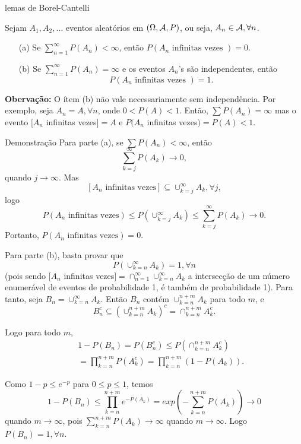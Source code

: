 \begin{frame}{lemas de Borel-Cantelli}

\begin{lema}
	Sejam $A_1,A_2,\ldots$ eventos aleatórios em $(\Omega,{\cal A},P)$, ou
	seja, $A_n\in {\cal A}, \forall n$.
	\begin{itemize}
		\item[(a)] Se $\sum_{n=1}^{\infty}P(A_n)<\infty$, então $P(A_n\mbox{ infinitas vezes
		})=0$.
		
		\item[(b)] Se $\sum_{n=1}^{\infty}P(A_n)=\infty$ e os eventos $A_n$'s são independentes, então
		$$P(A_n\mbox{ infinitas vezes
		})=1.$$
	\end{itemize}
\end{lema}

{\bf Obervação:} O ítem (b) não vale necessariamente sem
independência. Por exemplo, seja $A_n=A,\forall n$, onde $0<P(A)<1$.
Então, $\sum P(A_n)=\infty$ mas o evento $[A_n$ infinitas vezes$]=A$
e $P(A_n$ infinitas vezes$)=P(A)<1$.

\begin{block}{Demonstração}
%
%
Para parte (a), se $\sum P(A_n)<\infty$, então
$$\sum_{k=j}^{\infty}P(A_k)\rightarrow 0,$$ quando
$j\rightarrow\infty$. Mas $$[A_n\mbox{ infinitas vezes}]\subseteq
\cup_{k=j}^{\infty}A_k, \forall j,$$ logo
$$P(A_n\mbox{ infinitas vezes})\leq P(\cup_{k=j}^{\infty}A_k)\leq \sum_{k=j}^{\infty}P(A_k)\rightarrow 0.$$
Portanto, $P(A_n\mbox{ infinitas vezes})=0$.
\end{block}
\end{frame}
%
\begin{frame}
\begin{block}{}
%
%
Para parte (b), basta provar que
$$P(\cup_{k=n}^{\infty}A_k)=1,\forall n$$
(pois sendo $[A_n$ infinitas
vezes$]=\cap_{n=1}^{\infty}\cup_{k=n}^{\infty}A_k$ a intersecção de
um número enumerável de eventos de probabilidade 1, é também de
probabilidade 1). Para tanto, seja $B_n=\cup_{k=n}^{\infty}A_k$.
Então $B_n$ contém $\cup_{k=n}^{n+m}A_k$ para todo $m$, e
$$B_n^c\subseteq (\cup_{k=n}^{n+m}A_k)^c=\cap_{k=n}^{n+m}A_k^c.$$

Logo para todo $m$,
\begin{eqnarray}
& & 1-P(B_n)=P(B_n^c)\leq P(\cap_{k=n}^{n+m}A_k^c) \nonumber\\
& & =\prod_{k=n}^{n+m}P(A_k^c)=\prod_{k=n}^{n+m}(1-P(A_k)).\nonumber
\end{eqnarray}

Como $1-p\leq e^{-p}$ para $0\leq p\leq 1$, temos
$$1-P(B_n)\leq \prod_{k=n}^{n+m}e^{-P(A_k)}=exp(-\sum_{k=n}^{n+m}P(A_k))\rightarrow 0$$
quando $m\rightarrow\infty$, pois
$\sum_{k=n}^{n+m}P(A_k)\rightarrow\infty$ quando
$m\rightarrow\infty$. Logo $P(B_n)=1, \forall n$. 
%
\end{block}
\end{frame}
